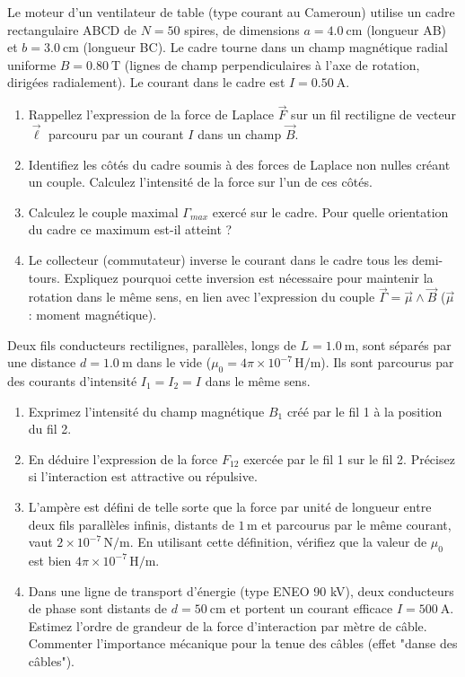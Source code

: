 \documentclass[11pt]{article}
\begin{document}
\begin{exercice}
Le moteur d'un ventilateur de table (type courant au Cameroun) utilise un cadre rectangulaire ABCD de $N = 50$ spires, de dimensions $a = \SI{4,0}{\centi\meter}$ (longueur AB) et $b = \SI{3,0}{\centi\meter}$ (longueur BC). Le cadre tourne dans un champ magnétique radial uniforme $B = \SI{0,80}{\tesla}$ (lignes de champ perpendiculaires à l'axe de rotation, dirigées radialement). Le courant dans le cadre est $I = \SI{0,50}{\ampere}$.
\begin{enumerate}
    \item Rappellez l'expression de la force de Laplace $\vec{F}$ sur un fil rectiligne de vecteur $\vec{\ell}$ parcouru par un courant $I$ dans un champ $\vec{B}$.
    \item Identifiez les côtés du cadre soumis à des forces de Laplace non nulles créant un couple. Calculez l'intensité de la force sur l'un de ces côtés.
    \item Calculez le couple maximal $\Gamma_{max}$ exercé sur le cadre. Pour quelle orientation du cadre ce maximum est-il atteint ?
    \item Le collecteur (commutateur) inverse le courant dans le cadre tous les demi-tours. Expliquez pourquoi cette inversion est nécessaire pour maintenir la rotation dans le même sens, en lien avec l'expression du couple $\vec{\Gamma} = \vec{\mu} \wedge \vec{B}$ ($\vec{\mu}$ : moment magnétique).
\end{enumerate}
\end{exercice}

\begin{exercice}
Deux fils conducteurs rectilignes, parallèles, longs de $L = \SI{1,0}{\meter}$, sont séparés par une distance $d = \SI{1,0}{\meter}$ dans le vide ($\mu_0 = 4\pi \times 10^{-7}\,\text{H/m}$). Ils sont parcourus par des courants d'intensité $I_1 = I_2 = I$ dans le même sens.
\begin{enumerate}
    \item Exprimez l'intensité du champ magnétique $B_1$ créé par le fil 1 à la position du fil 2.
    \item En déduire l'expression de la force $F_{12}$ exercée par le fil 1 sur le fil 2. Précisez si l'interaction est attractive ou répulsive.
    \item L'ampère est défini de telle sorte que la force par unité de longueur entre deux fils parallèles infinis, distants de $1\,\text{m}$ et parcourus par le même courant, vaut $2 \times 10^{-7}\,\text{N/m}$. En utilisant cette définition, vérifiez que la valeur de $\mu_0$ est bien $4\pi \times 10^{-7}\,\text{H/m}$.
    \item Dans une ligne de transport d'énergie (type ENEO 90 kV), deux conducteurs de phase sont distants de $d = \SI{50}{\centi\meter}$ et portent un courant efficace $I = \SI{500}{\ampere}$. Estimez l'ordre de grandeur de la force d'interaction par mètre de câble. Commenter l'importance mécanique pour la tenue des câbles (effet "danse des câbles").
\end{enumerate}
\end{exercice}
\end{document}
